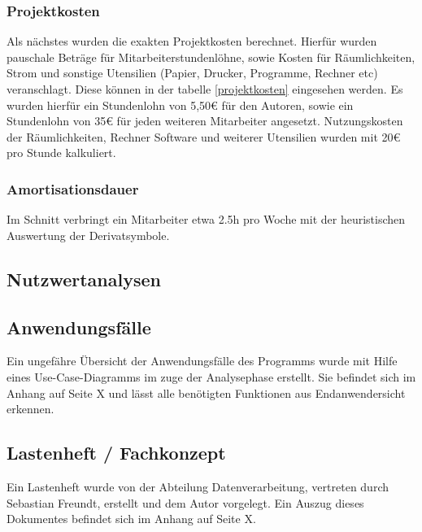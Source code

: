 \subsubsection{Projektkosten}
Als nächstes wurden die exakten Projektkosten berechnet. Hierfür wurden pauschale Beträge 
für Mitarbeiterstundenlöhne, sowie Kosten für Räumlichkeiten, Strom und sonstige Utensilien 
(Papier, Drucker, Programme, Rechner etc) veranschlagt. Diese können in der tabelle 
\ref{projektkosten} eingesehen werden. Es wurden hierfür ein Stundenlohn von 5,50€ für den 
Autoren, sowie ein Stundenlohn von 35€ für jeden weiteren Mitarbeiter angesetzt. Nutzungskosten 
der Räumlichkeiten, Rechner Software und weiterer Utensilien wurden mit 20€ pro Stunde kalkuliert. \par


\subsubsection{Amortisationsdauer}
Im Schnitt verbringt ein Mitarbeiter etwa 2.5h pro Woche mit der heuristischen Auswertung der Derivatsymbole.


\subsection{Nutzwertanalysen}

\subsection{Anwendungsfälle}
Ein ungefähre Übersicht der Anwendungsfälle des Programms wurde mit Hilfe eines Use-Case-Diagramms
im zuge der Analysephase erstellt. Sie befindet sich im Anhang auf Seite X und lässt
alle benötigten Funktionen aus Endanwendersicht erkennen.\par

\subsection{Lastenheft / Fachkonzept}
Ein Lastenheft wurde von der Abteilung Datenverarbeitung, vertreten durch Sebastian Freundt,
erstellt und dem Autor vorgelegt. Ein Auszug dieses Dokumentes befindet sich im Anhang auf Seite X.\par






\clearpage